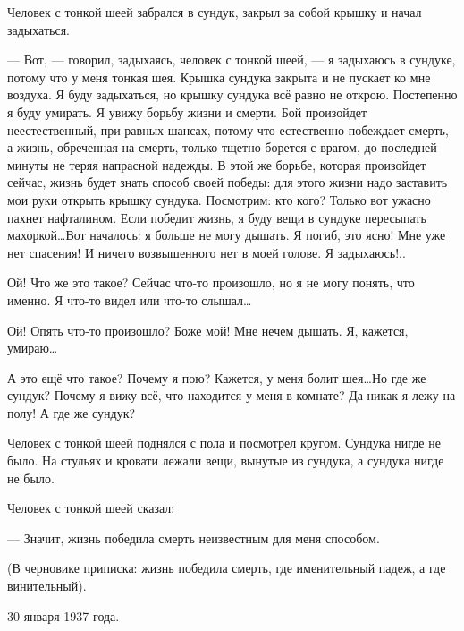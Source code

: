 Человек с тонкой шеей забрался в сундук, закрыл за собой крышку и начал задыхаться.
 
--- Вот, --- говорил, задыхаясь, человек с тонкой шеей, --- я задыхаюсь в сундуке, потому что у меня тонкая шея. Крышка сундука закрыта и не пускает ко мне воздуха. Я буду задыхаться, но крышку сундука всё равно не открою. Постепенно я буду умирать. Я увижу борьбу жизни и смерти. Бой произойдет неестественный, при равных шансах, потому что естественно побеждает смерть, а жизнь, обреченная на смерть, только тщетно борется с врагом, до последней минуты не теряя напрасной надежды. В этой же борьбе, которая произойдет сейчас, жизнь будет знать способ своей победы: для этого жизни надо заставить мои руки открыть крышку сундука. Посмотрим: кто кого? Только вот ужасно пахнет нафталином. Если победит жизнь, я буду вещи в сундуке пересыпать махоркой\dots\space Вот началось: я больше не могу дышать. Я погиб, это ясно! Мне уже нет спасения! И ничего возвышенного нет в моей голове. Я задыхаюсь!..
 
Ой! Что же это такое? Сейчас что-то произошло, но я не могу понять, что именно. Я что-то видел или что-то слышал\dots
 
Ой! Опять что-то произошло? Боже мой! Мне нечем дышать. Я, кажется, умираю\dots
 
А это ещё что такое? Почему я пою? Кажется, у меня болит шея\dots\space Но где же сундук? Почему я вижу всё, что находится у меня в комнате? Да никак я лежу на полу! А где же сундук?
 
Человек с тонкой шеей поднялся с пола и посмотрел кругом. Сундука нигде не было. На стульях и кровати лежали вещи, вынутые из сундука, а сундука нигде не было.
 
Человек с тонкой шеей сказал:
 
--- Значит, жизнь победила смерть неизвестным для меня способом.
 
(В черновике приписка: жизнь победила смерть, где именительный падеж, а где винительный).

\begin{flushright}
30 января 1937 года.
\end{flushright}